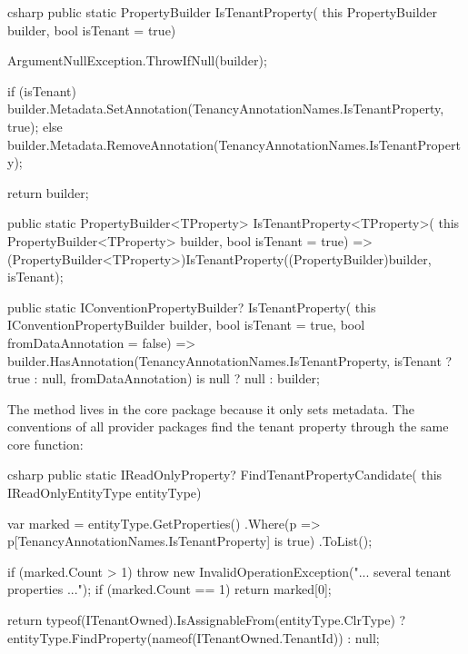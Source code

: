 \begin{sourcecode}{csharp}
public static PropertyBuilder IsTenantProperty(
    this PropertyBuilder builder, bool isTenant = true)
{
    ArgumentNullException.ThrowIfNull(builder);

    if (isTenant)
        builder.Metadata.SetAnnotation(TenancyAnnotationNames.IsTenantProperty, true);
    else
        builder.Metadata.RemoveAnnotation(TenancyAnnotationNames.IsTenantProperty);

    return builder;
}

public static PropertyBuilder<TProperty> IsTenantProperty<TProperty>(
    this PropertyBuilder<TProperty> builder, bool isTenant = true)
    => (PropertyBuilder<TProperty>)IsTenantProperty((PropertyBuilder)builder, isTenant);

public static IConventionPropertyBuilder? IsTenantProperty(
    this IConventionPropertyBuilder builder,
    bool isTenant = true,
    bool fromDataAnnotation = false)
    => builder.HasAnnotation(TenancyAnnotationNames.IsTenantProperty,
           isTenant ? true : null, fromDataAnnotation) is null
        ? null
        : builder;
\end{sourcecode}

The method lives in the core package because it only sets metadata. The conventions of all
provider packages find the tenant property through the same core function:

\begin{sourcecode}{csharp}
public static IReadOnlyProperty? FindTenantPropertyCandidate(
    this IReadOnlyEntityType entityType)
{
    var marked = entityType.GetProperties()
        .Where(p => p[TenancyAnnotationNames.IsTenantProperty] is true)
        .ToList();

    if (marked.Count > 1)
        throw new InvalidOperationException("... several tenant properties ...");
    if (marked.Count == 1)
        return marked[0];

    return typeof(ITenantOwned).IsAssignableFrom(entityType.ClrType)
        ? entityType.FindProperty(nameof(ITenantOwned.TenantId))
        : null;
}
\end{sourcecode}

